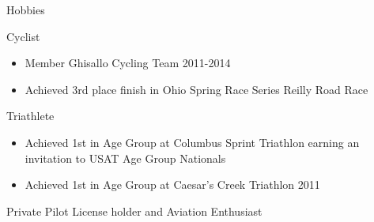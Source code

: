 \begin{category}{Hobbies}

\citembullet Cyclist
\begin{itemize}
\item Member Ghisallo Cycling Team 2011-2014
\item Achieved 3rd place finish in Ohio Spring Race Series Reilly Road Race
\end{itemize}

\citembullet Triathlete  
\begin{itemize}
\item Achieved 1st in Age Group at Columbus Sprint Triathlon earning an invitation to USAT Age Group Nationals
\item  Achieved 1st in Age Group at Caesar's Creek Triathlon 2011 
\end{itemize}

\citembullet Private Pilot License holder and Aviation Enthusiast 
\end{category}
